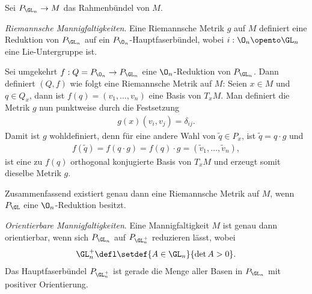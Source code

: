 \documentclass[%
	paper=a5,%
	fleqn,%
	DIV=18,%
	BCOR=0mm,
	fontsize=11pt,
	titlepage=false,%
	bibliography=totoc,
	DIV=18,%
	twoside=true,
	pdftitle=Riemannsche Geometrie,
	pdfauthor=Uwe Semmelmann,
	numbers=noendperiod]%
	{scrbook}
\begin{document}
\begin{ex}
Sei $P_{\GL_n}\to M$ das Rahmenbündel von $M$.
\begin{exenum}
\item \textit{Riemannsche Mannigfaltigkeiten}. Eine Riemannsche Metrik $g$ auf
$M$ definiert eine Reduktion von $P_{\GL_n}$ auf ein
$P_{\O_n}$-Hauptfaserbündel, wobei $i: \O_n\opento \GL_n$ eine Lie-Untergruppe
ist.

{
\centering
{}

}

Sei umgekehrt $f: Q = P_{\O_n} \to P_{\GL_n}$ eine $\O_n$-Reduktion von
$P_{\GL_n}$. Dann definiert $(Q,f)$ wie folgt eine Riemannsche Metrik auf
$M$: Seien $x\in M$ und $q\in Q_x$, dann ist $f(q) = (v_1,\ldots,v_n)$ eine
Basis von $T_xM$. Man definiert die Metrik $g$ nun punktweise durch die
Festsetzung
\begin{align*}
g(x)(v_i,v_j) = \delta_{ij}.
\end{align*}
Damit ist $g$ wohldefiniert, denn für eine andere Wahl von $\tilde{q}\in P_x$,
ist $\tilde{q} = q\cdot g$ und
\begin{align*}
f(\tilde{q}) = f(q\cdot g) = f(q)\cdot g = (\tilde{v}_1,\ldots,\tilde{v}_n),
\end{align*}
ist eine zu $f(q)$ orthogonal konjugierte Basis von $T_xM$ und erzeugt somit
dieselbe Metrik $g$.

Zusammenfassend existiert genau dann eine Riemannsche Metrik auf $M$, wenn
$P_{\GL}$ eine $\O_n$-Reduktion besitzt.
\item \textit{Orientierbare Mannigfaltigkeiten}. Eine Mannigfaltigkeit $M$ ist
genau dann orientierbar, wenn sich $P_{\GL_n}$ auf $P_{\GL_n^+}$ reduzieren
lässt, wobei
\begin{align*}
\GL_n^+\defl \setdef{A\in\GL_n}{\det A > 0}.
\end{align*}
Das Hauptfaserbündel $P_{\GL_n^+}$ ist gerade die Menge aller Basen in
$P_{\GL_n}$ mit positiver Orientierung.


\end{exenum}
\end{ex}
\end{document}
